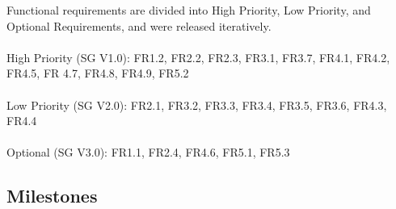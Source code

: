 \documentclass[11pt]{article}
\begin{document}
Functional requirements are divided into High Priority, Low Priority, and Optional Requirements, and were released iteratively.
\\ \\
High Priority (SG V1.0): FR1.2, FR2.2, FR2.3, FR3.1, FR3.7, FR4.1, FR4.2, FR4.5, FR 4.7, FR4.8, FR4.9, FR5.2
\\ \\
Low Priority (SG V2.0): FR2.1, FR3.2, FR3.3, FR3.4, FR3.5, FR3.6, FR4.3, FR4.4
\\ \\
Optional (SG V3.0): FR1.1, FR2.4, FR4.6, FR5.1, FR5.3

\subsection{Milestones}
\end{document}
